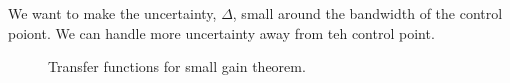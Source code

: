 We want to make the uncertainty, $\Delta$, small around the bandwidth of the control poiont. We can handle more uncertainty away from teh control point.

\begin{figure}[ht!]
	\centering
	 \hfill
	\caption{Transfer functions for small gain theorem.}
	\label{fig:15sgt}
\end{figure}

